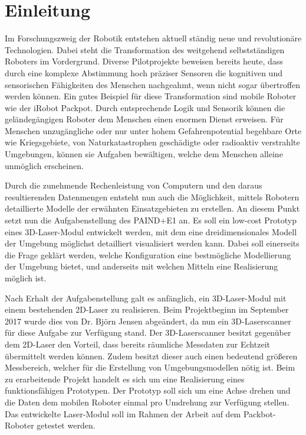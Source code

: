 
\chapter{Einleitung}

Im Forschungszweig der Robotik entstehen aktuell ständig neue und revolutionäre Technologien. Dabei steht die Transformation des weitgehend selbstständigen Roboters im Vordergrund. Diverse Pilotprojekte beweisen bereits heute, dass durch eine komplexe Abstimmung hoch präziser Sensoren die kognitiven und sensorischen Fähigkeiten des Menschen nachgeahmt, wenn nicht sogar übertroffen werden können. Ein gutes Beispiel für diese Transformation sind mobile Roboter wie der iRobot Packpot. Durch entsprechende Logik und Sensorik können die geländegängigen Roboter dem Menschen einen enormen Dienst erweisen. Für Menschen unzugängliche oder nur unter hohem Gefahrenpotential begehbare Orte wie Kriegsgebiete, von Naturkatastrophen geschädigte oder radioaktiv verstrahlte Umgebungen, können sie Aufgaben bewältigen, welche dem Menschen alleine unmöglich erscheinen.

Durch die zunehmende Rechenleistung von Computern und den daraus resultierenden Datenmengen entsteht nun auch die Möglichkeit, mittels Robotern detaillierte Modelle der erwähnten Einsatzgebieten zu erstellen. An diesem Punkt setzt nun die Aufgabenstellung des PAIND+E1 an. Es soll ein low-cost Prototyp eines 3D-Laser-Modul entwickelt werden, mit dem eine dreidimensionales Modell der Umgebung möglichst detailliert visualisiert werden kann. Dabei soll einerseits die Frage geklärt werden, welche Konfiguration eine bestmögliche Modellierung der Umgebung bietet, und anderseits mit welchen Mitteln eine Realisierung möglich ist.

Nach Erhalt der Aufgabenstellung galt es anfänglich, ein 3D-Laser-Modul mit einem bestehenden 2D-Laser zu realisieren. Beim Projektbeginn im September 2017 wurde dies von Dr. Björn Jensen abgeändert, da nun ein 3D-Laserscanner für diese Aufgabe zur Verfügung stand. Der 3D-Laserscanner besitzt gegenüber dem 2D-Laser den Vorteil, dass bereits räumliche Messdaten zur Echtzeit übermittelt werden können. Zudem besitzt dieser auch einen bedeutend größeren Messbereich, welcher für die Erstellung von Umgebungsmodellen nötig ist. Beim zu erarbeitende Projekt handelt es sich um eine Realisierung eines funktionsfähigen Prototypen. Der Prototyp soll sich um eine Achse drehen und die Daten dem mobilen Roboter einmal pro Umdrehung zur Verfügung stellen. Das entwickelte Laser-Modul soll im Rahmen der Arbeit auf dem Packbot-Roboter getestet werden.

